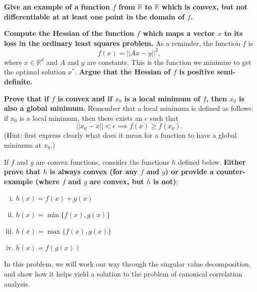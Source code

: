 \begin{Parts}


\Part \textbf{Give an example of a function $f$ from $\mathbb{R}$ to $\mathbb{R}$ which is convex, but not differentiable at at least one point in the domain of $f$.}


\Part \textbf{Compute the Hessian of the function $f$ which maps a vector $x$ to its loss in the ordinary least squares problem.} As a reminder, the function $f$ is $$f(x) = ||Ax-y||^2,$$ where $x \in \mathbb{R}^d$ and $A$ and $y$ are constants. This is the function we minimize to get the optimal solution $x^*$. \textbf{Argue that the Hessian of $f$ is positive semi-definite.}


% 

\Part \textbf{Prove that if $f$ is convex and if $x_0$ is a local minimum of $f$, then $x_0$ is also a global minimum.} Remember that a local minimum is defined as follows: if $x_0$ is a local minimum, then there exists an $\epsilon$ such that $$||x_0-x|| < \epsilon \implies f(x) \geq f(x_0).$$ (Hint: first express clearly what does it mean for a function to have a global minimum at $x_0$.) 


\Part If $f$ and $g$ are convex functions, consider the functions $h$ defined below. \textbf{Either prove that $h$ is always convex (for any $f$ and $g$) or provide a counter-example (where $f$ and $g$ are convex, but $h$ is not)}:
\begin{enumerate}[(i)]
	\item $h(x) = f(x) + g(x)$
	\item $h(x) = \min{\{f(x), g(x)\}}$
	\item $h(x) = \max{\{f(x), g(x)\}}$
	\item $h(x) = f(g(x))$
\end{enumerate}	


\end{Parts}

\newcommand{\EE}{\ensuremath{\mathbb{E}}}


In this problem, we will work our way through the singular value decomposition, and show how it helps yield a solution to the problem of canonical correlation analysis.

